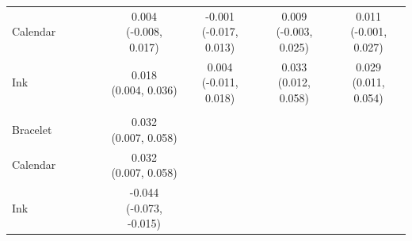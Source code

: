 \documentclass[
]{article}
\begin{document}
\begin{table}
{\begin{tabular}[t]{lcccccccc}
\addlinespace \addlinespace \hspace{1em}Calendar &  &  &  &  & \makecell[c]{0.004\\(-0.008, 0.017)} & \makecell[c]{-0.001\\(-0.017, 0.013)} & \makecell[c]{0.009\\(-0.003, 0.025)} & \makecell[c]{0.011\\(-0.001, 0.027)}\\
\addlinespace \addlinespace \hspace{1em}Ink &  &  &  &  & \makecell[c]{0.018\\(0.004, 0.036)} & \makecell[c]{0.004\\(-0.011, 0.018)} & \makecell[c]{0.033\\(0.012, 0.058)} & \makecell[c]{0.029\\(0.011, 0.054)}\\
\addlinespace \addlinespace \addlinespace[0.3em]
\hline
\multicolumn{9}{l}{\textit{\textbf{Panel C: Private}}}\\
\hline
\hspace{1em}Bracelet &  &  &  &  & \makecell[c]{0.032\\(0.007, 0.058)} &  &  & \\
\addlinespace \addlinespace \hspace{1em}Calendar &  &  &  &  & \makecell[c]{0.032\\(0.007, 0.058)} &  &  & \\
\addlinespace \addlinespace \hspace{1em}Ink &  &  &  &  & \makecell[c]{-0.044\\(-0.073, -0.015)} &  &  & \\
\bottomrule
\end{tabular}}
\end{table}
\end{document}

